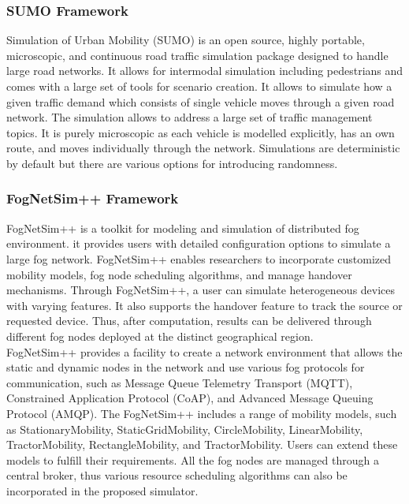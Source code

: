 				\subsubsection{SUMO Framework}
				Simulation of Urban Mobility (SUMO) \cite{sumo} is an open source, highly portable, microscopic, and continuous road traffic simulation package designed to handle large road networks. It allows for intermodal simulation including pedestrians and comes with a large set of tools for scenario creation. It allows to simulate how a given traffic demand which consists of single vehicle moves through a given road network. The simulation allows to address a large set of traffic management topics. It is purely microscopic as each vehicle is modelled explicitly, has an own route, and moves individually through the network. Simulations are deterministic by default but there are various options for introducing randomness. 
	
				\subsubsection{FogNetSim++ Framework}
				FogNetSim++ \cite{qayyum2018fognetsim++} is a toolkit for modeling and simulation of distributed fog environment. it provides users with detailed configuration options to simulate a large fog network. FogNetSim++ enables researchers to incorporate customized mobility models, fog node scheduling algorithms, and manage handover mechanisms. Through FogNetSim++, a user can simulate heterogeneous devices with varying features. It also supports the handover feature to track the source or requested device. Thus, after computation, results can be delivered through different fog nodes deployed at the distinct geographical region. \\
				FogNetSim++ provides a facility to create a network environment that allows the static and dynamic nodes in the network and use various fog protocols for communication, such as Message Queue Telemetry Transport (MQTT), Constrained Application Protocol (CoAP), and Advanced Message Queuing Protocol (AMQP). The FogNetSim++ includes a range of mobility models, such as StationaryMobility, StaticGridMobility, CircleMobility, LinearMobility, TractorMobility, RectangleMobility, and TractorMobility. Users can extend these models to fulfill their requirements. All the fog nodes are managed through a central broker, thus various resource scheduling algorithms can also be incorporated in the proposed simulator.
				

